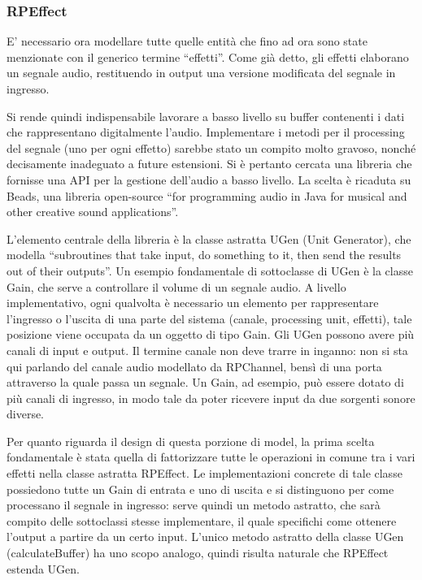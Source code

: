 \documentclass[a4paper,12pt]{report}
\begin{document}
\subsubsection{RPEffect}
E’ necessario ora modellare tutte quelle entità che fino ad ora sono state menzionate con il generico termine “effetti”. Come già detto, gli effetti elaborano un segnale audio, restituendo in output una versione modificata del segnale in ingresso. 

Si rende quindi indispensabile lavorare a basso livello su buffer contenenti i dati che rappresentano digitalmente l’audio. Implementare i metodi per il processing del segnale (uno per ogni effetto) sarebbe stato un compito molto gravoso, nonché decisamente inadeguato a future estensioni.
Si è pertanto cercata una libreria che fornisse una API per la gestione dell’audio a basso livello. La scelta è ricaduta su Beads, una libreria open-source “for programming audio in Java for musical and other creative sound applications”. 

L’elemento centrale della libreria è la classe astratta UGen (Unit Generator), che modella “subroutines that take input, do something to it, then send the results out of their outputs”.
Un esempio fondamentale di sottoclasse di UGen è la classe Gain, che serve a controllare il volume di un segnale audio. A livello implementativo, ogni qualvolta è necessario un elemento per rappresentare l’ingresso o l’uscita di una parte del sistema (canale, processing unit, effetti), tale posizione viene occupata da un oggetto di tipo Gain.
Gli UGen possono avere più canali di input e output. Il termine canale non deve trarre in inganno: non si sta qui parlando del canale audio modellato da RPChannel, bensì di una porta attraverso la quale passa un segnale. Un Gain, ad esempio, può essere dotato di più canali di ingresso, in modo tale da poter ricevere input da due sorgenti sonore diverse.

Per quanto riguarda il design di questa porzione di model, la prima scelta fondamentale è stata quella di fattorizzare tutte le operazioni in comune tra i vari effetti nella classe astratta RPEffect. Le implementazioni concrete di tale classe possiedono tutte un Gain di entrata e uno di uscita e si distinguono per come processano il segnale in ingresso: serve quindi un metodo astratto, che sarà compito delle sottoclassi stesse implementare, il quale specifichi come ottenere l’output a partire da un certo input. L’unico metodo astratto della classe UGen (calculateBuffer) ha uno scopo analogo, quindi risulta naturale che RPEffect estenda UGen. 
\end{document}
